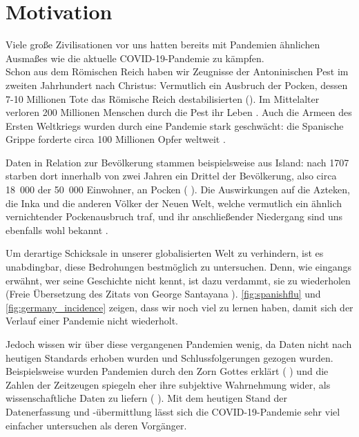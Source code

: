\chapter{Motivation}\label{chap:Motivation}
Viele große Zivilisationen vor uns hatten bereits mit Pandemien ähnlichen Ausmaßes wie die aktuelle COVID-19-Pandemie zu kämpfen.\\
Schon aus dem Römischen Reich haben wir Zeugnisse der \glqq{}Antoninischen Pest\grqq{} im zweiten Jahrhundert nach Christus: Vermutlich ein Ausbruch der Pocken, dessen 7-10 Millionen Tote das Römische Reich destabilisierten (\autocite{RomPest}). %
Im Mittelalter verloren 200 Millionen Menschen durch die Pest ihr Leben \autocite{PestMittelalter}.
Auch die Armeen des Ersten Weltkriegs wurden durch eine Pandemie stark geschwächt: die \glqq{}Spanische Grippe\grqq{} forderte circa 100 Millionen Opfer weltweit \autocite{SpanischeGrippe}.

Daten in Relation zur Bevölkerung stammen beispielsweise aus Island: nach 1707 starben dort innerhalb von zwei Jahren ein Drittel der Bevölkerung, also circa  18~000 der 50~000 Einwohner, an Pocken (\autocite{americaPandemics}%
). Die Auswirkungen auf die Azteken, die Inka und die anderen Völker der Neuen Welt, welche vermutlich ein ähnlich vernichtender Pockenausbruch traf, und ihr anschließender Niedergang sind uns ebenfalls wohl bekannt \autocite{americaPandemics}.

Um derartige Schicksale in unserer globalisierten Welt zu verhindern, ist es unabdingbar, diese Bedrohungen bestmöglich zu untersuchen. Denn, wie eingangs erwähnt, \glqq{}wer seine Geschichte nicht kennt, ist dazu verdammt, sie zu wiederholen\grqq{} (Freie Übersetzung des Zitats von George Santayana \autocite{history-quoteSantayana}).
\autoref{fig:spanishflu} und \autoref{fig:germany_incidence} zeigen, dass wir noch viel zu lernen haben, damit sich der Verlauf einer Pandemie nicht wiederholt.


Jedoch wissen wir über diese vergangenen Pandemien wenig, da Daten nicht nach heutigen Standards erhoben wurden und Schlussfolgerungen gezogen wurden. Beispielsweise wurden Pandemien durch den Zorn Gottes erklärt (\autocite{americaPandemics}%
) und die Zahlen der Zeitzeugen spiegeln eher ihre subjektive Wahrnehmung wider, als wissenschaftliche Daten zu liefern (\autocite{americaPandemics}%
). Mit dem heutigen Stand der Datenerfassung und -übermittlung lässt sich die COVID-19-Pandemie sehr viel einfacher untersuchen als deren Vorgänger.

